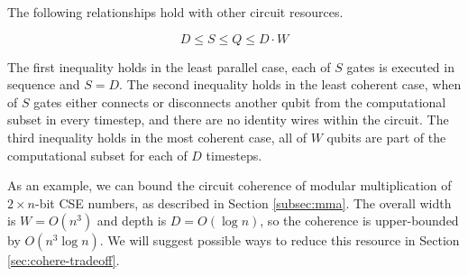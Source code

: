 The following relationships hold with other circuit resources.

\begin{equation}
D \le S \le Q \le D\cdot W
\end{equation}

The first inequality holds in the least parallel case, each of $S$ gates is executed in sequence
and $S=D$. The second inequality holds in the least coherent case, when of $S$ gates
either connects or disconnects another qubit from the computational subset in every timestep, and
there are no identity wires within the circuit. The third inequality holds in the
most coherent case, all of $W$ qubits are part of the computational subset for each of $D$ timesteps.

As an example, we can bound the circuit coherence of modular multiplication of $2\times n$-bit
CSE numbers, as described in Section \ref{subsec:mma}. The overall width is $W = O(n^3)$ and
depth is $D=O(\log n)$, so the coherence is upper-bounded by $O(n^3\log n)$. We will suggest possible
ways to reduce this resource in Section \ref{sec:cohere-tradeoff}.
